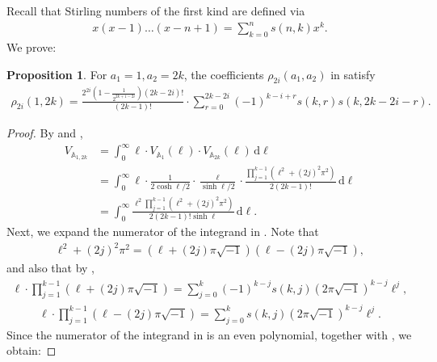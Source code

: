 \documentclass{amsart}
\theoremstyle{definition}
\newtheorem{proposition}{Proposition}[section]
\begin{document}
Recall \cite[Section~1.3]{MR2868112} that Stirling numbers of the first kind are defined via
\begin{align}
\label{eq:stirling-numbers}
    x(x-1)\dotsc(x-n+1) = \sum_{k=0}^n s(n,k)x^k.
\end{align}
We prove:
\begin{proposition}
\label{prop:coeff-vol-bi-annuli}
For $a_1=1, a_2 = 2k$, the coefficients $\rho_{2i}(a_1,a_2)$ in  satisfy
\begin{align}
\label{eq:coeff-vol-bi-annuli}
\rho_{2i}(1,2k)  = \frac{2^{2i}(1-\frac{1}{2^{2k+1-2i}})(2k-2i)!}{(2k-1)!} \cdot\sum_{r=0}^{2k-2i}(-1)^{k-i+r} s(k,r)s(k,2k-2i-r). 
\end{align}
\end{proposition}

\begin{proof}
By  and ,
\begin{equation}
\begin{split}
\label{eq:vol-1-2k-annulus-int}
V_{\mathbb{A}_{1,2k}} 
&= \int_0^\infty 
\ell
\cdot V_{\mathbb{A}_{1}}(\ell)
\cdot V_{\mathbb{A}_{2k}}(\ell) 
\,\mathrm{d}\ell \\&=  \int_0^\infty \ell\cdot \frac{1}{2\cosh \ell/2}\cdot  \frac{\ell}{\sinh{\ell/2}} \cdot 
\frac{\prod_{j=1}^{k-1} (\ell^2+(2j)^2\pi^2)}{2(2k-1)!}\,\mathrm{d}\ell
\\& 
= \int_0^\infty \frac{\ell^2 \prod_{j=1}^{k-1} (\ell^2+(2j)^2\pi^2)}{2(2k-1)!\sinh \ell } \,\mathrm{d}\ell.
\end{split}
\end{equation}
Next, we expand the numerator of the integrand in . Note that 
\begin{align}
\label{eq:sum-of-two-squares}
\ell^2+(2j)^2\pi^2 =\left(\ell+(2j)\pi\sqrt{-1}\right)\left(\ell-(2j)\pi\sqrt{-1} \right),
\end{align}
and also that by ,
\begin{align}
\label{eq:prod-poly-plus}
\ell\cdot\prod_{j=1}^{k-1} \left(\ell+(2j)\pi\sqrt{-1}\right) = \sum_{j=0}^{k}(-1)^{k-j} s(k,j)\left(2\pi\sqrt{-1}\right)^{k-j}\ell^j, 
\end{align}
\begin{align}
\label{eq:prod-poly-minus}
\ell\cdot\prod_{j=1}^{k-1} \left(\ell-(2j)\pi\sqrt{-1}\right) = \sum_{j=0}^{k} s(k,j)\left(2\pi\sqrt{-1}\right)^{k-j}\ell^j. 
\end{align}
Since the numerator of the integrand in  is an even polynomial, together with , we obtain: 

\end{proof}
\end{document}

